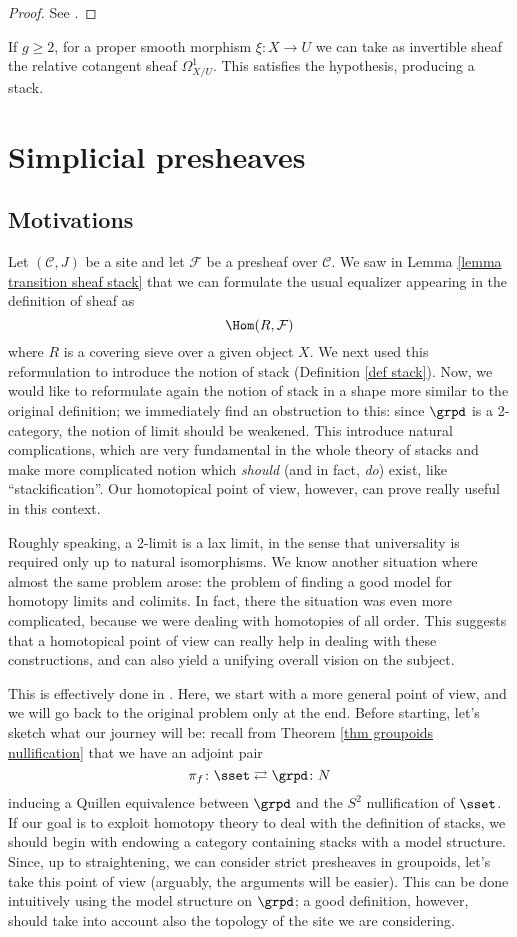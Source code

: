\begin{proof}
See .
\end{proof}

If $g \ge 2$, for a proper smooth morphism $\xi \colon X \to U$ we can take as invertible sheaf the relative cotangent sheaf $\Omega^1_{X/U}$. This satisfies the hypothesis, producing a stack.

\section{Simplicial presheaves}

\subsection{Motivations}

Let $(\mathcal C,J)$ be a site and let $\mathcal F$ be a presheaf over $\mathcal C$. We saw in Lemma \ref{lemma transition sheaf stack} that we can formulate the usual equalizer appearing in the definition of sheaf as
\[
\Hom(R,\mathcal F)
\]
where $R$ is a covering sieve over a given object $X$. We next used this reformulation to introduce the notion of stack (Definition \ref{def stack}). Now, we would like to reformulate again the notion of stack in a shape more similar to the original definition; we immediately find an obstruction to this: since $\grpd$ is a 2-category, the notion of limit should be weakened. This introduce natural complications, which are very fundamental in the whole theory of stacks and make more complicated notion which \emph{should} (and in fact, \emph{do}) exist, like ``stackification''. Our homotopical point of view, however, can prove really useful in this context.

Roughly speaking, a 2-limit is a lax limit, in the sense that universality is required only up to natural isomorphisms. We know another situation where almost the same problem arose: the problem of finding a good model for homotopy limits and colimits. In fact, there the situation was even more complicated, because we were dealing with homotopies of all order. This suggests that a homotopical point of view can really help in dealing with these constructions, and can also yield a unifying overall vision on the subject.

This is effectively done in . Here, we start with a more general point of view, and we will go back to the original problem only at the end. Before starting, let's sketch what our journey will be: recall from Theorem \ref{thm groupoids nullification} that we have an adjoint pair
\[
\pi_f \colon \sset \rightleftarrows \grpd \colon N
\]
inducing a Quillen equivalence between $\grpd$ and the $S^2$ nullification of $\sset$. If our goal is to exploit homotopy theory to deal with the definition of stacks, we should begin with endowing a category containing stacks with a model structure. Since, up to straightening, we can consider strict presheaves in groupoids, let's take this point of view (arguably, the arguments will be easier). This can be done intuitively using the model structure on $\grpd$; a good definition, however, should take into account also the topology of the site we are considering.

